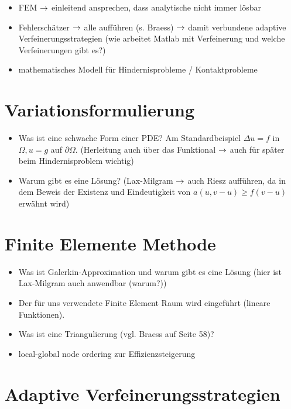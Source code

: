 \label{sec:Grundlagen}

\begin{itemize}
\item FEM $\rightarrow$ einleitend ansprechen, dass analytische nicht immer lösbar
\item Fehlerschätzer $\rightarrow$ alle aufführen (s. Braess) $\rightarrow$ damit verbundene adaptive Verfeinerungsstrategien (wie arbeitet Matlab mit Verfeinerung und welche Verfeinerungen gibt es?)
\item mathematisches Modell für Hindernisprobleme / Kontaktprobleme
\end{itemize}

\section{Variationsformulierung}

\begin{itemize}
\item Was ist eine schwache Form einer PDE? Am Standardbeispiel $\Delta u = f$ in $\Omega, u = g$ auf $\partial \Omega$. (Herleitung auch über das Funktional $\rightarrow$ auch für später beim Hindernisproblem wichtig)
\item Warum gibt es eine Lösung? (Lax-Milgram $\rightarrow$ auch Riesz aufführen, da in dem Beweis der Existenz und Eindeutigkeit von $a(u,v-u)\ge f(v-u)$ erwähnt wird)
\end{itemize}

\section{Finite Elemente Methode}

\begin{itemize}
\item Was ist Galerkin-Approximation und warum gibt es eine Lösung (hier ist Lax-Milgram auch anwendbar (warum?))
\item Der für uns verwendete Finite Element Raum wird eingeführt (lineare Funktionen).
\item Was ist eine Triangulierung (vgl. Braess auf Seite 58)?
\item local-global node ordering zur Effizienzsteigerung
\end{itemize}

\section{Adaptive Verfeinerungsstrategien}

